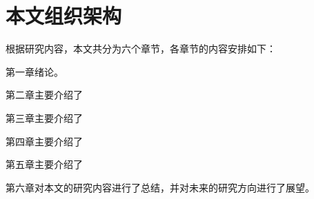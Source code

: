 \section{本文组织架构}
\par 根据研究内容，本文共分为六个章节，各章节的内容安排如下：
\par 第一章绪论。
\par 第二章主要介绍了
\par 第三章主要介绍了
\par 第四章主要介绍了
\par 第五章主要介绍了
\par 第六章对本文的研究内容进行了总结，并对未来的研究方向进行了展望。


